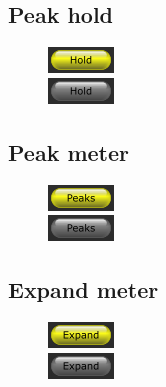 \subsection{Peak hold}

\begin{figure}[H]
  \centering{}
  \includegraphics[scale=\screenshotscale,clip]{include/images/button_peak_hold_on.png} \\
  \includegraphics[scale=\screenshotscale,clip]{include/images/button_peak_hold_off.png}
\end{figure}

\subsection{Peak meter}

\begin{figure}[H]
  \centering{}
  \includegraphics[scale=\screenshotscale,clip]{include/images/button_peak_meter_on.png} \\
  \includegraphics[scale=\screenshotscale,clip]{include/images/button_peak_meter_off.png}
\end{figure}

\subsection{Expand meter}

\begin{figure}[H]
  \centering{}
  \includegraphics[scale=\screenshotscale,clip]{include/images/button_expand_meter_on.png} \\
  \includegraphics[scale=\screenshotscale,clip]{include/images/button_expand_meter_off.png}
\end{figure}

